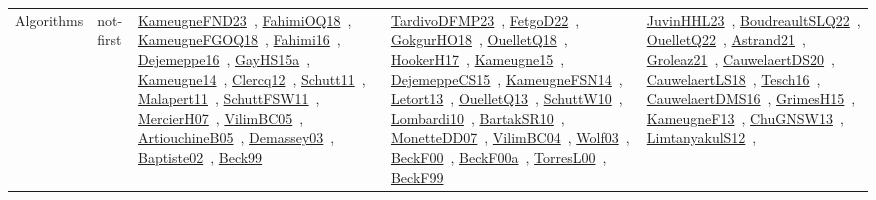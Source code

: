 {\begin{longtable}{lp{3cm}>{\raggedright\arraybackslash}p{6cm}>{\raggedright\arraybackslash}p{6cm}>{\raggedright\arraybackslash}p{8cm}}
Algorithms & not-first & \href{../works/KameugneFND23.pdf}{KameugneFND23}~\cite{KameugneFND23}, \href{../works/FahimiOQ18.pdf}{FahimiOQ18}~\cite{FahimiOQ18}, \href{../works/KameugneFGOQ18.pdf}{KameugneFGOQ18}~\cite{KameugneFGOQ18}, \href{../works/Fahimi16.pdf}{Fahimi16}~\cite{Fahimi16}, \href{../works/Dejemeppe16.pdf}{Dejemeppe16}~\cite{Dejemeppe16}, \href{../works/GayHS15a.pdf}{GayHS15a}~\cite{GayHS15a}, \href{../works/Kameugne14.pdf}{Kameugne14}~\cite{Kameugne14}, \href{../works/Clercq12.pdf}{Clercq12}~\cite{Clercq12}, \href{../works/Schutt11.pdf}{Schutt11}~\cite{Schutt11}, \href{../works/Malapert11.pdf}{Malapert11}~\cite{Malapert11}, \href{../works/SchuttFSW11.pdf}{SchuttFSW11}~\cite{SchuttFSW11}, \href{../works/MercierH07.pdf}{MercierH07}~\cite{MercierH07}, \href{../works/VilimBC05.pdf}{VilimBC05}~\cite{VilimBC05}, \href{../works/ArtiouchineB05.pdf}{ArtiouchineB05}~\cite{ArtiouchineB05}, \href{../works/Demassey03.pdf}{Demassey03}~\cite{Demassey03}, \href{../works/Baptiste02.pdf}{Baptiste02}~\cite{Baptiste02}, \href{../works/Beck99.pdf}{Beck99}~\cite{Beck99} & \href{../works/TardivoDFMP23.pdf}{TardivoDFMP23}~\cite{TardivoDFMP23}, \href{../works/FetgoD22.pdf}{FetgoD22}~\cite{FetgoD22}, \href{../works/GokgurHO18.pdf}{GokgurHO18}~\cite{GokgurHO18}, \href{../works/OuelletQ18.pdf}{OuelletQ18}~\cite{OuelletQ18}, \href{../works/HookerH17.pdf}{HookerH17}~\cite{HookerH17}, \href{../works/Kameugne15.pdf}{Kameugne15}~\cite{Kameugne15}, \href{../works/DejemeppeCS15.pdf}{DejemeppeCS15}~\cite{DejemeppeCS15}, \href{../works/KameugneFSN14.pdf}{KameugneFSN14}~\cite{KameugneFSN14}, \href{../works/Letort13.pdf}{Letort13}~\cite{Letort13}, \href{../works/OuelletQ13.pdf}{OuelletQ13}~\cite{OuelletQ13}, \href{../works/SchuttW10.pdf}{SchuttW10}~\cite{SchuttW10}, \href{../works/Lombardi10.pdf}{Lombardi10}~\cite{Lombardi10}, \href{../works/BartakSR10.pdf}{BartakSR10}~\cite{BartakSR10}, \href{../works/MonetteDD07.pdf}{MonetteDD07}~\cite{MonetteDD07}, \href{../works/VilimBC04.pdf}{VilimBC04}~\cite{VilimBC04}, \href{../works/Wolf03.pdf}{Wolf03}~\cite{Wolf03}, \href{../works/BeckF00.pdf}{BeckF00}~\cite{BeckF00}, \href{../works/BeckF00a.pdf}{BeckF00a}~\cite{BeckF00a}, \href{../works/TorresL00.pdf}{TorresL00}~\cite{TorresL00}, \href{../works/BeckF99.pdf}{BeckF99}~\cite{BeckF99} & \href{../works/JuvinHHL23.pdf}{JuvinHHL23}~\cite{JuvinHHL23}, \href{../works/BoudreaultSLQ22.pdf}{BoudreaultSLQ22}~\cite{BoudreaultSLQ22}, \href{../works/OuelletQ22.pdf}{OuelletQ22}~\cite{OuelletQ22}, \href{../works/Astrand21.pdf}{Astrand21}~\cite{Astrand21}, \href{../works/Groleaz21.pdf}{Groleaz21}~\cite{Groleaz21}, \href{../works/CauwelaertDS20.pdf}{CauwelaertDS20}~\cite{CauwelaertDS20}, \href{../works/CauwelaertLS18.pdf}{CauwelaertLS18}~\cite{CauwelaertLS18}, \href{../works/Tesch16.pdf}{Tesch16}~\cite{Tesch16}, \href{../works/CauwelaertDMS16.pdf}{CauwelaertDMS16}~\cite{CauwelaertDMS16}, \href{../works/GrimesH15.pdf}{GrimesH15}~\cite{GrimesH15}, \href{../works/KameugneF13.pdf}{KameugneF13}~\cite{KameugneF13}, \href{../works/ChuGNSW13.pdf}{ChuGNSW13}~\cite{ChuGNSW13}, \href{../works/LimtanyakulS12.pdf}{LimtanyakulS12}~\cite{LimtanyakulS12}, 
\end{longtable}}

